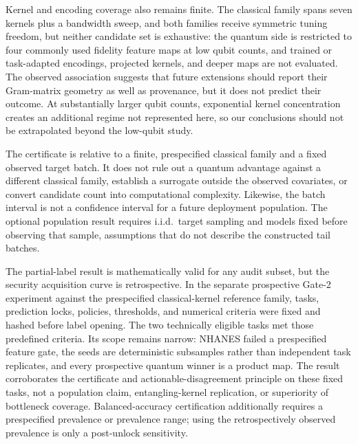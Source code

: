 \documentclass[referee,lineno,pdflatex,sn-vancouver-num]{sn-jnl}
\theoremstyle{thmstyleone}%
\theoremstyle{thmstyletwo}%
\theoremstyle{thmstylethree}%
\begin{document}
Kernel and encoding coverage also remains finite. The classical family spans seven kernels plus a bandwidth sweep, and both families receive symmetric tuning freedom, but neither candidate set is exhaustive: the quantum side is restricted to four commonly used fidelity feature maps at low qubit counts, and trained or task-adapted encodings, projected kernels, and deeper maps are not evaluated. The observed association suggests that future extensions should report their Gram-matrix geometry as well as provenance, but it does not predict their outcome. At substantially larger qubit counts, exponential kernel concentration \cite{thanasilp2024concentration} creates an additional regime not represented here, so our conclusions should not be extrapolated beyond the low-qubit study.

The certificate is relative to a finite, prespecified classical family and a fixed observed target batch. It does not rule out a quantum advantage against a different classical family, establish a surrogate outside the observed covariates, or convert candidate count into computational complexity. Likewise, the batch interval is not a confidence interval for a future deployment population. The optional population result requires i.i.d.\ target sampling and models fixed before observing that sample, assumptions that do not describe the constructed tail batches.

The partial-label result is mathematically valid for any audit subset, but the security acquisition curve is retrospective. In the separate prospective Gate-2 experiment against the prespecified classical-kernel reference family, tasks, prediction locks, policies, thresholds, and numerical criteria were fixed and hashed before label opening. The two technically eligible tasks met those predefined criteria. Its scope remains narrow: NHANES failed a prespecified feature gate, the seeds are deterministic subsamples rather than independent task replicates, and every prospective quantum winner is a product map. The result corroborates the certificate and actionable-disagreement principle on these fixed tasks, not a population claim, entangling-kernel replication, or superiority of bottleneck coverage. Balanced-accuracy certification additionally requires a prespecified prevalence or prevalence range; using the retrospectively observed prevalence is only a post-unlock sensitivity.
\end{document}
